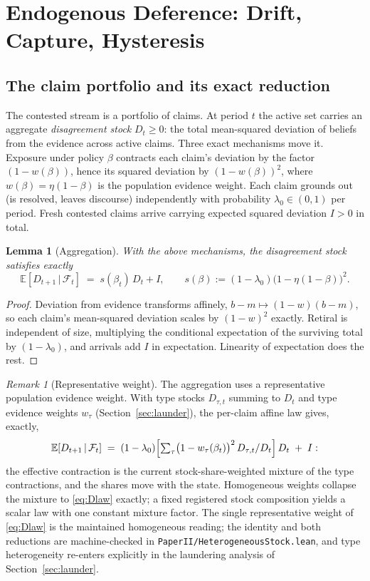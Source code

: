 \documentclass[11pt]{article}
\newtheorem{lemma}[theorem]{Lemma}
\theoremstyle{definition}
\theoremstyle{remark}
\newtheorem{remark}[theorem]{Remark}
\numberwithin{equation}{section}
\newcommand{\E}{\mathbb{E}}
\begin{document}
\section{Endogenous Deference: Drift, Capture, Hysteresis}\label{sec:dynamics}

\subsection{The claim portfolio and its exact reduction}\label{sec:portfolio}

The contested stream is a portfolio of claims. At period $t$ the active set carries an aggregate \emph{disagreement stock} $D_t \ge 0$: the total mean-squared deviation of beliefs from the evidence across active claims. Three exact mechanisms move it. Exposure under policy $\beta$ contracts each claim's deviation by the factor $(1-w(\beta))$, hence its squared deviation by $(1-w(\beta))^2$, where $w(\beta) = \eta(1-\beta)$ is the population evidence weight. Each claim grounds out (is resolved, leaves discourse) independently with probability $\lambda_0 \in (0,1)$ per period. Fresh contested claims arrive carrying expected squared deviation $I > 0$ in total.

\begin{lemma}[Aggregation]\label{lem:agg}
With the above mechanisms, the disagreement stock satisfies exactly
\begin{equation}\label{eq:Dlaw}
\E[D_{t+1}\,|\,\mathcal{F}_t] \;=\; s(\beta_t)\,D_t + I,
\qquad s(\beta) := (1-\lambda_0)\bigl(1-\eta(1-\beta)\bigr)^2 .
\end{equation}
\end{lemma}
\begin{proof}
Deviation from evidence transforms affinely, $b - m \mapsto (1-w)(b-m)$, so each claim's mean-squared deviation scales by $(1-w)^2$ exactly. Retiral is independent of size, multiplying the conditional expectation of the surviving total by $(1-\lambda_0)$, and arrivals add $I$ in expectation. Linearity of expectation does the rest.
\end{proof}

\begin{remark}[Representative weight]\label{rem:repweight}
The aggregation uses a representative population evidence weight. With type stocks $D_{\tau,t}$ summing to $D_t$ and type evidence weights $w_\tau$ (Section~\ref{sec:launder}), the per-claim affine law gives, exactly,
\[
\E[D_{t+1}\,|\,\mathcal{F}_t] \;=\; (1-\lambda_0)\Bigl[\textstyle\sum_\tau \bigl(1-w_\tau(\beta_t)\bigr)^2\, D_{\tau,t}/D_t\Bigr]\, D_t \;+\; I :
\]
the effective contraction is the current stock-share-weighted mixture of the type contractions, and the shares move with the state. Homogeneous weights collapse the mixture to \eqref{eq:Dlaw} exactly; a fixed registered stock composition yields a scalar law with one constant mixture factor. The single representative weight of \eqref{eq:Dlaw} is the maintained homogeneous reading; the identity and both reductions are machine-checked in \texttt{PaperII/HeterogeneousStock.lean}, and type heterogeneity re-enters explicitly in the laundering analysis of Section~\ref{sec:launder}.
\end{remark}
\end{document}
